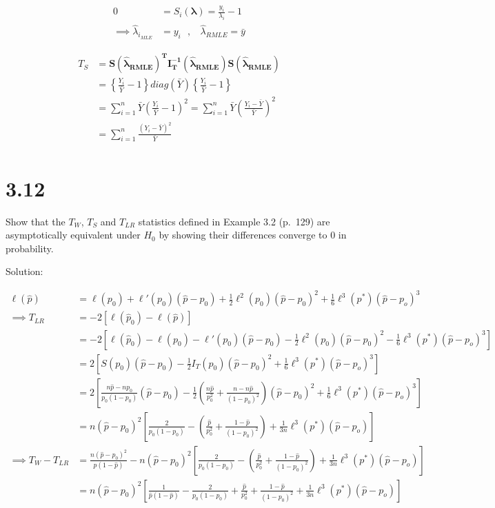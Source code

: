 \documentclass[
  letterpaper,
  DIV=11,
  numbers=noendperiod]{scrreprt}
\begin{document}
\[\begin{aligned}
0 &=S_i (\boldsymbol \lambda) = \frac {y_i} {\lambda_i}-1 \\
\implies \hat \lambda_{i_{MLE}} &=y_i~~~,~~~~ \hat \lambda_{RMLE} =\bar y
\end{aligned}\]

\[\begin{aligned}
T_S &= \mathbf {S(\boldsymbol{\hat \lambda}_{RMLE})^T I_T^{-1} (\boldsymbol {\hat \lambda_{RMLE}})S(\boldsymbol{\hat \lambda}_{RMLE})}\\
&= \left\{\frac {Y_i} {\bar Y}-1 \right\}diag(\bar Y)\left\{\frac {Y_i} {\bar Y}-1 \right\}\\
&= \sum_{i=1}^n \bar Y\left(\frac {Y_i} {\bar Y}-1 \right)^2=\sum_{i=1}^n \bar Y\left(\frac {Y_i - \bar Y} {\bar Y}\right)^2\\
&= \sum_{i=1}^n \frac {(Y_i-\bar Y)^2} {\bar Y}\\
\end{aligned}\]

\newpage

\hypertarget{section-23}{%
\section{3.12}\label{section-23}}

Show that the \(T_W\), \(T_S\) and \(T_{LR}\) statistics defined in
Example 3.2 (p.~129) are asymptotically equivalent under \(H_0\) by
showing their differences converge to 0 in probability.

Solution:

\[\begin{aligned}
\ell (\hat p) &= \ell(p_0) + \ell'(p_0)(\hat p - p_0) +\frac 1 2 \ell^{2}(p_0)(\hat p - p_0)^2+ \frac 1 6 \ell^3 (p^*)(\hat p - p_o)^3 \\
\implies T_{LR} &=-2\left[\ell (\hat p_0) - \ell (\hat p) \right] \\
&=-2\left[\ell (\hat p_0) - \ell(p_0) - \ell'(p_0)(\hat p - p_0) -\frac 1 2 \ell^{2}(p_0)(\hat p - p_0)^2- \frac 1 6 \ell^3 (p^*)(\hat p - p_o)^3 \right] \\
&=2\left[S(p_0)(\hat p - p_0) -\frac 1 2 I_T(p_0)(\hat p - p_0)^2+ \frac 1 6 \ell^3 (p^*)(\hat p - p_o)^3 \right] \\
&=2\left[\frac{n \hat p - n p_0}{p_0 (1-p_0)}(\hat p -p_0)-\frac 1 2 \left(\frac{n \hat p}{p_0^2}+ \frac{n-n\hat p}{(1-p_0)^2}\right)(\hat p - p_0)^2+ \frac 1 6 \ell^3 (p^*)(\hat p - p_o)^3 \right] \\
&=n (\hat p -p_0)^2\left[\frac{2}{p_0 (1-p_0)}-\left(\frac{\hat p}{p_0^2}+ \frac{1-\hat p}{(1-p_0)^2}\right)+ \frac 1 {3n} \ell^3 (p^*)(\hat p - p_o) \right] \\
\implies T_W- T_{LR} &= \frac{n(\hat p- p_0)^2}{\hat p (1-\hat p)} -n (\hat p -p_0)^2\left[\frac{2}{p_0 (1-p_0)}-\left(\frac{\hat p}{p_0^2}+ \frac{1-\hat p}{(1-p_0)^2}\right)+ \frac 1 {3n} \ell^3 (p^*)(\hat p - p_o) \right] \\
&= n(\hat p- p_0)^2\left[\frac 1 {\hat p (1-\hat p)}-\frac{2}{p_0 (1-p_0)}+\frac{\hat p}{p_0^2}+ \frac{1-\hat p}{(1-p_0)^2}+ \frac 1 {3n} \ell^3 (p^*)(\hat p - p_o) \right]
\end{aligned}\]
\end{document}
